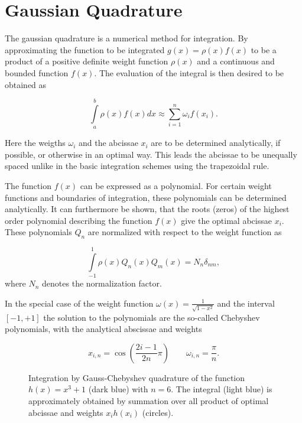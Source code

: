 \section{Gaussian Quadrature}
The gaussian quadrature is a numerical method for integration. By approximating
the function to be integrated $g(x) = \rho(x) f(x)$ to be a product of a
positive definite weight
function $\rho (x)$ and a continuous and bounded function $f(x)$. \cite{Wikipedia_Gauss_Quadratur}
The evaluation of the integral is then desired to be obtained as

\begin{equation}
  \int\limits_a^b \rho(x) f(x) dx \approx \sum\limits_{i=1}^n \omega_i f(x_i)  .
\end{equation}

Here the weigths $\omega_i$ and the abcissae $x_i$ are to be determined
analytically, if possible, or otherwise in an optimal way. This leads the abcissae
to be unequally spaced unlike in the basic
integration schemes using the trapezoidal rule.

The function $f(x)$ can be expressed as a polynomial.
For certain weight functions and boundaries
of integration, these
polynomials can be determined analytically.
It can furthermore be shown, that the roots (zeros) of the highest order polynomial
describing the function $f(x)$ give the optimal abcissae $x_i$.
These polynomials $Q_n$ are normalized with respect to the weight function as

\begin{equation}
  \int\limits_{-1}^{1} \rho(x) Q_n(x) Q_m(x) = N_n \delta_{nm}  ,
\end{equation}
where $N_n$ denotes the normalization factor.


In the special case of the weight function
$\omega(x)= \frac{1}{\sqrt{1-x^2}}$ and the interval $[-1,+1]$
the solution to the polynomials are the so-called Chebyshev polynomials, with
the analytical abscissae and weights

\begin{equation}
  x_{i,n} = \cos \left( \frac{2i-1}{2n} \pi \right)
  \quad\quad \omega_{i,n} = \frac \pi n .
\end{equation}

\begin{figure}[ht]
  \centering
  
  \caption{Integration by Gauss-Chebyshev quadrature of the function
           $h(x)=x^3 + 1$ (dark blue) with $n=6$. The integral (light blue)
           is approximately obtained by summation
           over all product of optimal abcissae and weights $x_ih(x_i)$ (circles).}
  \label{figure:gaussian_quadrature}
\end{figure}

